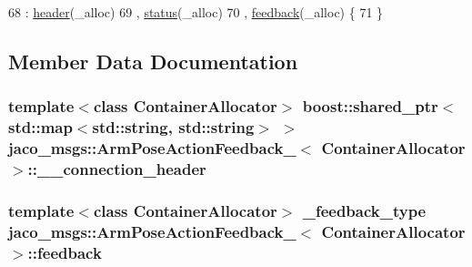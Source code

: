 \begin{DoxyCode}
68     : \hyperlink{structjaco__msgs_1_1ArmPoseActionFeedback___af09503192cc1120085e2f8ef58ab0dbb}{header}(\_alloc)
69     , \hyperlink{structjaco__msgs_1_1ArmPoseActionFeedback___a386a2bed5a7ad4dcd6b6135799f9882d}{status}(\_alloc)
70     , \hyperlink{structjaco__msgs_1_1ArmPoseActionFeedback___a27069f4ef80d8c3546354691d3511059}{feedback}(\_alloc)  \{
71     \}
\end{DoxyCode}


\subsection{Member Data Documentation}
\subsubsection[{\texorpdfstring{\+\_\+\+\_\+connection\+\_\+header}{__connection_header}}]{\setlength{\rightskip}{0pt plus 5cm}template$<$class Container\+Allocator$>$ boost\+::shared\+\_\+ptr$<$std\+::map$<$std\+::string, std\+::string$>$ $>$ {\bf jaco\+\_\+msgs\+::\+Arm\+Pose\+Action\+Feedback\+\_\+}$<$ Container\+Allocator $>$\+::\+\_\+\+\_\+connection\+\_\+header}\hypertarget{structjaco__msgs_1_1ArmPoseActionFeedback___a5926651155af1b0644889987fabceac3}{}\label{structjaco__msgs_1_1ArmPoseActionFeedback___a5926651155af1b0644889987fabceac3}
\subsubsection[{\texorpdfstring{feedback}{feedback}}]{\setlength{\rightskip}{0pt plus 5cm}template$<$class Container\+Allocator$>$ {\bf \+\_\+feedback\+\_\+type} {\bf jaco\+\_\+msgs\+::\+Arm\+Pose\+Action\+Feedback\+\_\+}$<$ Container\+Allocator $>$\+::feedback}\hypertarget{structjaco__msgs_1_1ArmPoseActionFeedback___a27069f4ef80d8c3546354691d3511059}{}\label{structjaco__msgs_1_1ArmPoseActionFeedback___a27069f4ef80d8c3546354691d3511059}
